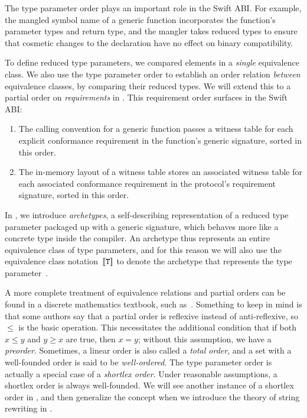 \documentclass[../generics]{subfiles}
\begin{document}
The type parameter order plays an important role in the Swift ABI. For example, the mangled symbol name of a generic function incorporates the function's parameter types and return type, and the mangler takes reduced types to ensure that cosmetic changes to the declaration have no effect on binary compatibility.

To define reduced type parameters, we compared elements in a \emph{single} equivalence class. We also use the type parameter order to establish an order relation \emph{between} equivalence classes, by comparing their reduced types. We will extend this to a partial order on \emph{requirements} in . This requirement order surfaces in the Swift ABI:
\begin{enumerate}
\item The calling convention for a generic function passes a witness table for each explicit conformance requirement in the function's generic signature, sorted in this order.
\item The in-memory layout of a witness table stores an associated witness table for each associated conformance requirement in the protocol's requirement signature, sorted in this order.
\end{enumerate}

In , we introduce \emph{archetypes}, a self-describing representation of a reduced type parameter packaged up with a generic signature, which behaves more like a concrete type inside the compiler. An archetype thus represents an entire equivalence class of type parameters, and for this reason we will also use the equivalence class notation~$[\![\texttt{T}]\!]$ to denote the archetype that represents the type parameter~\tT.

A more complete treatment of equivalence relations and partial orders can be found in a discrete mathematics textbook, such as~\cite{grimaldi}. Something to keep in mind is that some authors say that a partial order is reflexive instead of anti-reflexive, so $\leq$ is the basic operation. This necessitates the additional condition that if both $x\leq y$ and $y\geq x$ are true, then $x=y$; without this assumption, we have a \emph{preorder}. Sometimes, a linear order is also called a \emph{total order}, and a set with a well-founded order is said to be \emph{well-ordered}. The type parameter order is actually a special case of a \emph{shortlex order}. Under reasonable assumptions, a shortlex order is always well-founded. We will see another instance of a shortlex order in , and then generalize the concept when we introduce the theory of string rewriting in .
\end{document}
